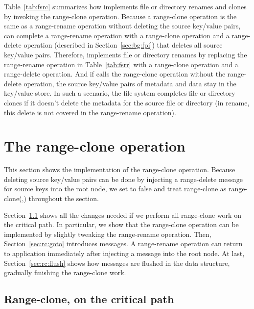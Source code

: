 Table~\ref{tab:fsrc} summarizes how \betrfs implements file or
directory renames and clones by invoking the range-clone operation.
Because a range-clone operation is the same as a range-rename operation without
deleting the source key/value pairs,
\betrfs can complete a range-rename operation with a range-clone operation and
a range-delete operation (described in Section~\ref{sec:bg:fpi})
that deletes all source key/value pairs.
Therefore, \betrfs implements file or directory renames
by replacing the range-rename operation in Table~\ref{tab:fsrr} with
a range-clone operation and a range-delete operation.
And if \betrfs calls the range-clone operation without the range-delete
operation,
the source key/value pairs of metadata and data stay in the key/value store.
In such a scenario, the file system completes file or directory clones if it
doesn't delete the metadata for the source file or directory
(in rename, this delete is not covered in the range-rename operation).

\section{The range-clone operation}
\label{sec:rc:rc}

This section shows the implementation of the range-clone operation.
Because deleting source key/value pairs can be done by injecting a range-delete
message for source keys into the root node,
we set \delold to false and treat range-clone as range-clone(\spre,\dpre)
throughout the section.

Section~\ref{sec:rc:crit} shows all the changes needed if we perform all
range-clone work on the critical path.
In particular, we show that the range-clone operation can be implemented
by slightly tweaking the range-rename operation.
Then, Section~\ref{sec:rc:goto} introduces \goto messages.
A range-rename operation can return to application immediately after injecting
a \goto message into the root node.
At last, Section~\ref{sec:rc:flush} shows how \goto messages are flushed in
the data structure, gradually finishing the range-clone work.


\subsection{Range-clone, on the critical path}
\label{sec:rc:crit}

